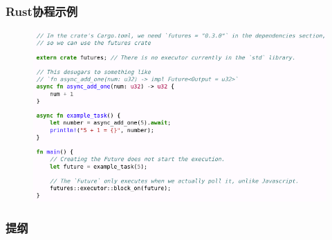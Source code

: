 \begin{frame}[fragile]
    \frametitle{Rust协程示例}
% 
	\begin{figure}
		\centering
		\includegraphics[width=0.8\linewidth]{figs/Rust-example.png}
	\end{figure}

\end{frame}
% 
\begin{frame}
\frametitle{提纲} %
\tableofcontents %
\end{frame}
